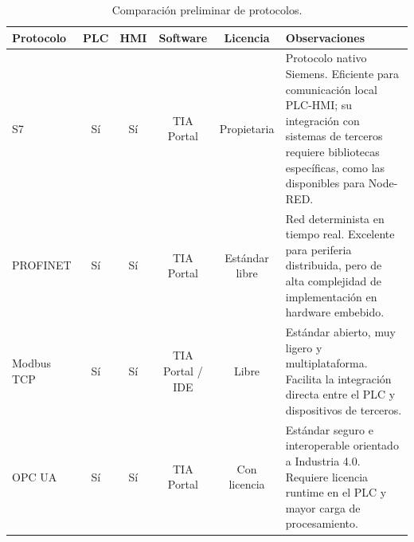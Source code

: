 \begin{table}[H]
\centering
\scriptsize
\caption{Comparación preliminar de protocolos.}\label{tab:protocolos}
\begin{tabularx}{\textwidth}{L{2.2cm}ccccY}
\toprule
\textbf{Protocolo} & \textbf{PLC} & \textbf{HMI} & \textbf{Software} & \textbf{Licencia} & \textbf{Observaciones} \\
\midrule
S7 & Sí & Sí & TIA Portal & Propietaria & Protocolo nativo Siemens. Eficiente para comunicación local PLC-HMI; su integración con sistemas de terceros requiere bibliotecas específicas, como las disponibles para Node-RED. \\
PROFINET & Sí & Sí & TIA Portal & Estándar libre & Red determinista en tiempo real. Excelente para periferia distribuida, pero de alta complejidad de implementación en hardware embebido. \\
Modbus TCP & Sí & Sí & TIA Portal / IDE & Libre & Estándar abierto, muy ligero y multiplataforma. Facilita la integración directa entre el PLC y dispositivos de terceros. \\
OPC UA & Sí & Sí & TIA Portal & Con licencia & Estándar seguro e interoperable orientado a Industria 4.0. Requiere licencia runtime en el PLC y mayor carga de procesamiento. \\
\bottomrule
\end{tabularx}
\end{table}